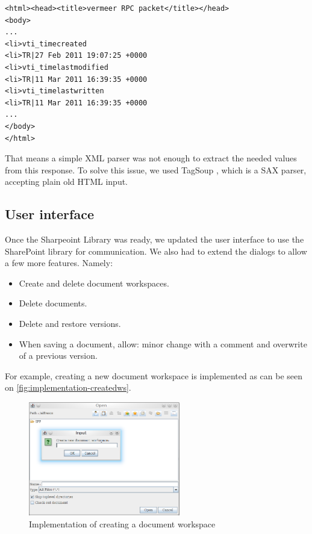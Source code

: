 \begin{lstlisting}
<html><head><title>vermeer RPC packet</title></head>
<body>
...
<li>vti_timecreated
<li>TR|27 Feb 2011 19:07:25 +0000
<li>vti_timelastmodified
<li>TR|11 Mar 2011 16:39:35 +0000
<li>vti_timelastwritten
<li>TR|11 Mar 2011 16:39:35 +0000
...
</body>
</html>\end{lstlisting}

That means a simple XML parser was not enough to extract the needed values from
this response. To solve this issue, we used TagSoup \cite{tagsoup}, which is a
SAX parser, accepting plain old HTML input.

\subsection{User interface}

Once the Sharpeoint Library was ready, we updated the user interface to use the
SharePoint library for communication. We also had to extend the dialogs to allow
a few more features. Namely:

\begin{itemize}
\item Create and delete document workspaces.
\item Delete documents.
\item Delete and restore versions.
\item When saving a document, allow: minor change with a comment and overwrite of a previous version.
\end{itemize}

For example, creating a new document workspace is implemented as can be seen on
\autoref{fig:implementation-createdws}.

\begin{figure}[H]
\centering
\includegraphics[width=250px,keepaspectratio]{implementation-createdws.png}
\caption{Implementation of creating a document workspace}
\label{fig:implementation-createdws}
\end{figure}

